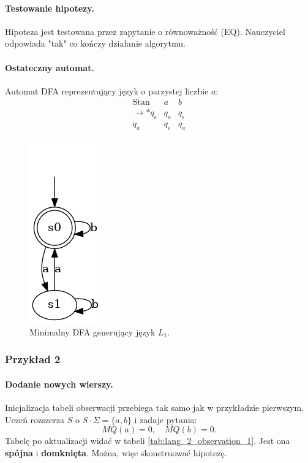\paragraph*{Testowanie hipotezy.}
Hipoteza jest testowana przez zapytanie o równoważność (EQ). Nauczyciel odpowiada "tak" co kończy działanie algorytmu. 

\paragraph*{Ostateczny automat.}
Automat DFA reprezentujący język o parzystej liczbie \( a \):
\[
\begin{array}{c|c|c}
\text{Stan} & a & b \\
\hline
\rightarrow * q_\epsilon & q_a & q_\epsilon \\
q_a & q_\epsilon & q_a \\
\end{array}
\]

\begin{figure}[ht]
    \centering
    \includegraphics[width=0.2\linewidth]{images/dfa_even_a.png}
    \caption{Minimalny DFA generujący język $L_1$.}
    \label{fig:dfa_even_a}
\end{figure}

\subsubsection{Przykład 2}

\paragraph*{Dodanie nowych wierszy.}
Inicjalizacja tabeli obserwacji przebiega tak samo jak w przykładzie pierwszym.
Uczeń rozszerza \( S \) o \( S \cdot \Sigma = \{a, b\} \) i zadaje pytania:
\[
MQ(a) = 0, \quad MQ(b) = 0.
\]
Tabelę po aktualizacji widać w tabeli \ref{tab:lang_2_observation_1}. Jest ona \textbf{spójna} i \textbf{domknięta}. Można, więc skonstruować hipotezę.


